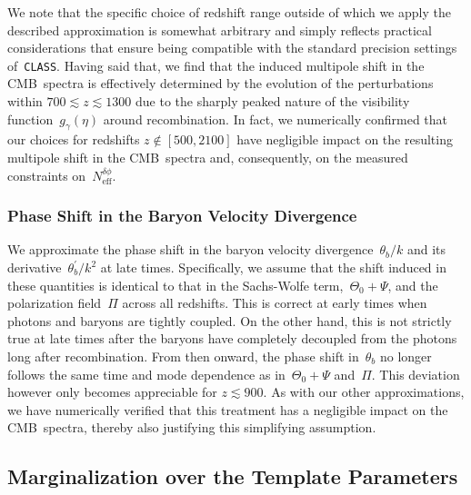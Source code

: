\documentclass[11pt]{article}
\numberwithin{equation}{section}
\newcommand{\Nphase}{N_\mathrm{eff}^{\delta\phi}}
\begin{document}
We note that the specific choice of redshift range outside of which we apply the described approximation is somewhat arbitrary and simply reflects practical considerations that ensure being compatible with the standard precision settings of~\texttt{CLASS}. Having said that, we find that the induced multipole shift in the CMB~spectra is effectively determined by the evolution of the perturbations within $700 \lesssim z \lesssim 1300$ due to the sharply peaked nature of the visibility function~$g_\gamma(\eta)$ around recombination. In fact, we numerically confirmed that our choices for redshifts $z \notin [500, 2100]$ have negligible impact on the resulting multipole shift in the CMB~spectra and, consequently, on the measured constraints on~$\Nphase$.


\subsubsection*{Phase Shift in the Baryon Velocity Divergence}

We approximate the phase shift in the baryon velocity divergence~$\theta_b/k$ and its derivative~$\theta_b^\prime/k^2$ at late times. Specifically, we assume that the shift induced in these quantities is identical to that in the Sachs-Wolfe term,~$\Theta_0+\Psi$, and the polarization field~$\Pi$ across all redshifts. This is correct at early times when photons and baryons are tightly coupled. On the other hand, this is not strictly true at late times after the baryons have completely decoupled from the photons long after recombination. From then onward, the phase shift in~$\theta_b$ no longer follows the same time and mode dependence as in~$\Theta_0 + \Psi$ and~$\Pi$. This deviation however only becomes appreciable for $z \lesssim 900$. As with our other approximations, we have numerically verified that this treatment has a negligible impact on the CMB~spectra, thereby also justifying this simplifying assumption.


\subsection{Marginalization over the Template Parameters}
\label{app:pbt-marginalization}
\end{document}

